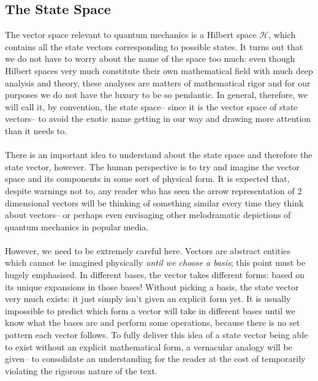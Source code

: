 \subsection{The State Space}
The vector space relevant to quantum mechanics is a Hilbert space $\mathscr{H}$, which contains all the state vectors corresponding to possible states. It turns out that we do not have to worry about the name of the space too much: even though Hilbert spaces very much constitute their own mathematical field with much deep analysis and theory, these analyses are matters of mathematical rigor and for our purposes we do not have the luxury to be so pendantic. In general, therefore, we will call it, by convention, the state space-- since it is the vector space of state vectors-- to avoid the exotic  name getting in our way and drawing more attention than it needs to.
\\\\
There is an important idea to understand about the state space and therefore the state vector, however. The human perspective is to try and imagine the vector space and its components in some sort of physical form. It is expected that, despite warnings not to, any reader who has seen the arrow representation of 2 dimensional vectors will be thinking of something similar every time they think about vectors-- or perhaps even envisaging other melodramatic depictions of  quantum mechanics in popular media.
\\\\
However, we need to be extremely careful here. Vectors are abstract entities which cannot be imagined physically \textit{until we choose a basis}; this point must be hugely emphasised. In different bases, the vector takes different forms: based on its unique expansions in those bases! Without picking a basis, the state vector very much exists: it just simply isn't given an explicit form yet. It is usually impossible to predict which form a vector will take in different bases until we know what the bases are and perform some operations, because there is no set pattern each vector follows. To fully deliver this idea of a state vector being able to exist without an explicit mathematical form, a vernacular analogy will be given-- to consolidate an understanding for the reader at the cost of temporarily violating the rigorous nature of the text. 
\\\\
